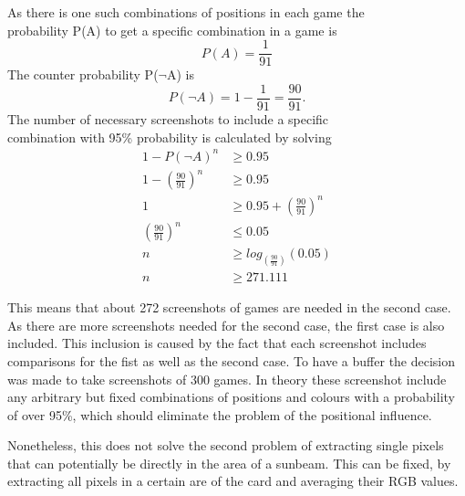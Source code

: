 \begin{center}
	As there is one such combinations of positions in each game the\\ probability P(A) to get a specific combination in a game is 
	\begin{equation*}
	P(A) = \frac{1}{91} %
	\end{equation*}
	The counter probability P($\lnot$A) is 
	\begin{equation*}
	P(\lnot A) = 1 - \frac{1}{91} = \frac{90}{91}.%
	\end{equation*}
	\newpage
	The number of necessary screenshots to include a specific \\combination with 95\% probability is calculated by solving
	\begin{align*}
	1 - P(\lnot A)^n &\geq 0.95 \\
	1 - \left(\frac{90}{91}\right)^n &\geq 0.95 \\
	1 &\geq 0.95 + \left(\frac{90}{91}\right)^n\\
	\left(\frac{90}{91}\right)^n &\leq 0.05\\
	n &\geq log_{(\frac{90}{91})}(0.05) \\
	n &\geq 271.111 %
	\end{align*}
\end{center}
This means that about 272 screenshots of games are needed in the second case. As there are more screenshots needed for the second case, the first case is also included. This inclusion is caused by the fact that each screenshot includes comparisons for the  fist  as well as the second case. To have a buffer the decision was made to take screenshots of 300 games. In theory these screenshot include any arbitrary but fixed combinations of positions and colours with a probability of over 95\%, which should eliminate the problem of the positional influence.

Nonetheless, this does not solve the second problem of extracting single pixels that can potentially be directly in the area of a sunbeam. This can be fixed, by extracting all pixels in a certain are of the card and averaging their RGB values.  %

